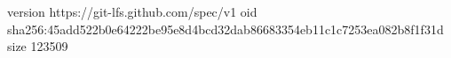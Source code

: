 version https://git-lfs.github.com/spec/v1
oid sha256:45add522b0e64222be95e8d4bcd32dab86683354eb11c1c7253ea082b8f1f31d
size 123509

